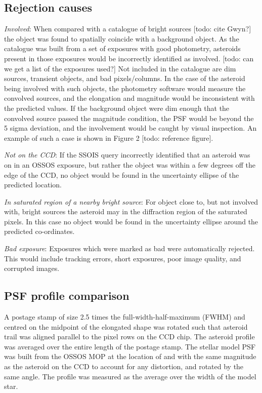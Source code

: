 \documentclass[iop,apj]{emulateapj}
\begin{document}
\subsection{Rejection causes}

\textit{Involved}:
When compared with a catalogue of bright sources [todo: cite Gwyn?] the object was found to spatially coincide with a background object. As the catalogue was built from a set of exposures with good photometry, asteroids present in those exposures would be incorrectly identified as involved. [todo: can we get a list of the exposures used?] Not included in the catalogue are dim sources, transient objects, and bad pixels/columns. In the case of the asteroid being involved with such objects, the photometry software would measure the convolved sources, and the elongation and magnitude would be inconsistent with the predicted values. If the background object were dim enough that the convolved source passed the magnitude condition, the PSF would be beyond the 5 sigma deviation, and the involvement would be caught by visual inspection. An example of such a case is shown in Figure 2 [todo: reference figure].

\textit{Not on the CCD}:
If the SSOIS query incorrectly identified that an asteroid was on in an OSSOS exposure, but rather the object was within a few degrees off the edge of the CCD, no object would be found in the uncertainty ellipse of the predicted location.

\textit{In saturated region of a nearby bright source}:
For object close to, but not involved with, bright sources the asteroid may in the diffraction region of the saturated pixels. In this case no object would be found in the uncertainty ellipse around the predicted co-ordinates.

\textit{Bad exposure}:
Exposures which were marked as bad were automatically rejected. This would include tracking errors, short exposures, poor image quality, and corrupted images. 

\subsection{PSF profile comparison}

A postage stamp of size 2.5 times the full-width-half-maximum (FWHM) and centred on the midpoint of the elongated shape was rotated such that asteroid trail was aligned parallel to the pixel rows on the CCD chip. The asteroid profile was averaged over the entire length of the postage stamp. The stellar model PSF was built from the OSSOS MOP at the location of and with the same magnitude as the asteroid on the CCD to account for any distortion, and rotated by the same angle.  The profile was measured as the average over the width of the model star. 
\end{document}
